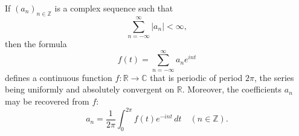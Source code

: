 If $(a_n)_{n \in \mathbb{Z}}$ is a complex sequence such that
$$\sum_{n=-\infty}^{\infty} |a_n| < \infty,$$
then the formula
$$f(t) = \sum_{n=-\infty}^{\infty} a_n e^{int}$$
defines a continuous function $f: \mathbb{R} \to \mathbb{C}$ that is periodic of period $2\pi$, the series being uniformly and absolutely convergent on $\mathbb{R}$. Moreover, the coefficients $a_n$ may be recovered from $f$:
$$a_n = \frac{1}{2\pi} \int_0^{2\pi} f(t) e^{-int} \, dt \quad (n \in \mathbb{Z}).$$
